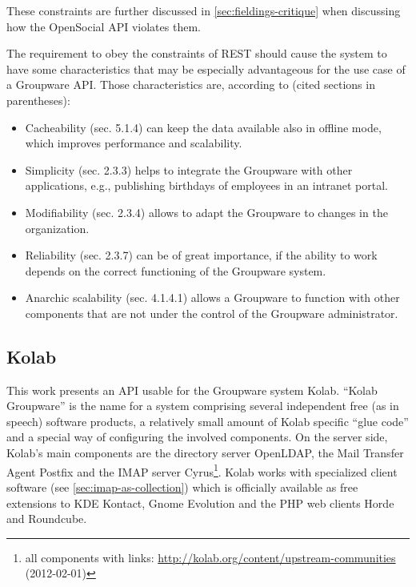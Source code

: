 \documentclass[11pt,a4paper,headsepline,twoside]{scrartcl}		%
\newcommand{\citeurl}[2]{\url{#1} (#2)}
\begin{document}
These constraints are further discussed in \autoref{sec:fieldings-critique} when
discussing how the OpenSocial API violates them.

The requirement to obey the constraints of REST should cause the system to have
some characteristics that may be especially advantageous for the use case of a
Groupware API. Those characteristics are, according to \cite{Fielding2000}
(cited sections in parentheses):

\begin{itemize}
\item Cacheability (sec. 5.1.4) can keep the data available also in offline
  mode, which improves performance and scalability.
\item Simplicity (sec. 2.3.3) helps to integrate the Groupware with other
  applications, e.g., publishing birthdays of employees in an intranet portal.
\item Modifiability (sec. 2.3.4) allows to adapt the Groupware to changes in the
  organization.
\item Reliability (sec. 2.3.7) can be of great importance, if the ability to
  work depends on the correct functioning of the Groupware system.
\item Anarchic scalability (sec. 4.1.4.1) allows a Groupware to function with
  other components that are not under the control of the Groupware
  administrator.
\end{itemize}


\subsection{Kolab}
\label{sec:kolab}

This work presents an API usable for the Groupware system Kolab. ``Kolab
Groupware'' is the name for a system comprising several independent free (as in
speech) software products, a relatively small amount of Kolab specific ``glue
code'' and a special way of configuring the involved components. On the server
side, Kolab's main components are the directory server OpenLDAP, the Mail
Transfer Agent Postfix and the IMAP server Cyrus\footnote{all components with
  links:
  \citeurl{http://kolab.org/content/upstream-communities}{2012-02-01}}. Kolab
works with specialized client software (see \autoref{sec:imap-as-collection})
which is officially available as free extensions to KDE Kontact, Gnome Evolution
and the PHP web clients Horde and Roundcube.
\end{document}
